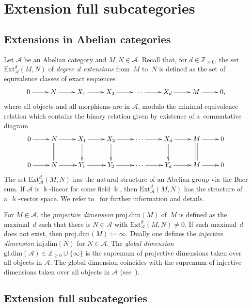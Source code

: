 \documentclass[11pt]{article}
\begin{document}
\section{Extension full subcategories}\label{s1}

\subsection{Extensions in Abelian categories}%

Let $\mathcal{A}$ be an Abelian category and $M,N\in\mathcal{A}$.
Recall that, for $d\in\mathbb{Z}_{\geq 0}$, the set $\mathrm{Ext}_{\mathcal{A}}^d(M,N)$ of {\em degree~$d$ extensions}
from~$M$ to~$N$ is def\/ined as the set of equivalence classes of exact sequences
\begin{gather*}
\xymatrix{
0\ar[r]&N\ar[r]&X_1\ar[r]&X_2\ar[r]&\cdots\ar[r]&X_d\ar[r]&M\ar[r]&0,
}
\end{gather*}
where all objects and all morphisms are in $\mathcal{A}$, modulo the minimal equivalence relation which contains the
binary relation given by existence of a~commutative diagram
\begin{gather*}
\xymatrix{
0\ar[r]&N\ar[r]\ar@{=}[d]&X_1\ar[r]\ar[d]&X_2\ar[r]\ar[d]&\cdots\ar[r]&X_d\ar[r]\ar[d]&M\ar[r]\ar@{=}[d]&0\\
0\ar[r]&N\ar[r]&Y_1\ar[r]&Y_2\ar[r]&\cdots\ar[r]&Y_d\ar[r]&M\ar[r]&0
}
\end{gather*}
The set $\mathrm{Ext}_{\mathcal{A}}^d(M,N)$ has the natural structure of an Abelian group via the Baer sum.
If $\mathcal{A}$ is $\Bbbk$-linear for some f\/ield $\Bbbk$, then $\mathrm{Ext}_{\mathcal{A}}^d(M,N)$ has the structure of
a~$\Bbbk$-vector space.
We refer to~\cite[Section~3.4]{We} for further information and details.

For $M\in\mathcal{A}$, the {\em projective dimension} $\mathrm{proj.dim}(M)$ of~$M$ is def\/ined as the maximal~$d$ such
that there is $N\in \mathcal{A}$ with $\mathrm{Ext}_{\mathcal{A}}^d(M,N)\neq 0$.
If such maximal~$d$ does not exist, then $\mathrm{proj.dim}(M):=\infty$.
Dually one def\/ines the {\em injective dimension} $\mathrm{inj.dim}(N)$ for $N\in\mathcal{A}$.
The {\em global dimension} $\mathrm{gl.dim}(\mathcal{A})\in\mathbb{Z}_{\geq 0}\cup\{\infty\}$ is the supremum of
projective dimensions taken over all objects in $\mathcal{A}$.
The global dimension coincides with the supremum of injective dimensions taken over all objects in $\mathcal{A}$
(see~\cite[Lemma~5.11.11]{Zi}).

\subsection{Extension full subcategories}\label{s1.2}
\end{document}
